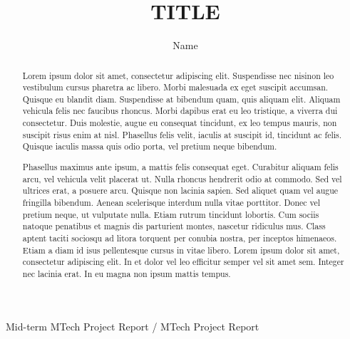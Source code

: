 \documentclass{article}
\title{\large \bf TITLE }
\author{Name}
\date{}
\begin{document}
	\maketitle
    \begin{center}
        Mid-term MTech Project Report / MTech Project Report
    \end{center}
        \vskip 12pt
	\thispagestyle{empty}
	
	
		\begin{abstract}
		Lorem ipsum dolor sit amet, consectetur adipiscing elit. Suspendisse nec 
		nisinon leo vestibulum cursus pharetra ac libero. Morbi malesuada ex eget 
		suscipit accumsan. Quisque eu blandit diam. Suspendisse at bibendum quam, 
		quis aliquam elit. Aliquam vehicula felis nec faucibus rhoncus. Morbi 
		dapibus erat eu leo tristique, a viverra dui consectetur. Duis molestie, 
		augue eu consequat tincidunt, ex leo tempus mauris, non suscipit risus enim 
		at nisl. Phasellus felis velit, iaculis at suscipit id, tincidunt ac felis. 
		Quisque iaculis massa quis odio porta, vel pretium neque bibendum.

		Phasellus maximus ante ipsum, a mattis felis consequat eget. Curabitur 
		aliquam felis arcu, vel vehicula velit placerat ut. Nulla rhoncus hendrerit 
		odio at commodo. Sed vel ultrices erat, a posuere arcu. Quisque non lacinia 
		sapien. Sed aliquet quam vel augue fringilla bibendum. Aenean scelerisque 
		interdum nulla vitae porttitor. Donec vel pretium neque, ut vulputate nulla.
		Etiam rutrum tincidunt lobortis. Cum sociis natoque penatibus et magnis dis 
		parturient montes, nascetur ridiculus mus. Class aptent taciti sociosqu ad 
		litora torquent per conubia nostra, per inceptos himenaeos. Etiam a diam id 
		isus pellentesque cursus in vitae libero. Lorem ipsum dolor sit amet,
		consectetur adipiscing elit. In et dolor vel leo efficitur semper vel sit 
		amet sem. Integer nec lacinia erat. In eu magna non ipsum mattis tempus.
	\end{abstract}	
	
	\hfill \\
	
\end{document}
